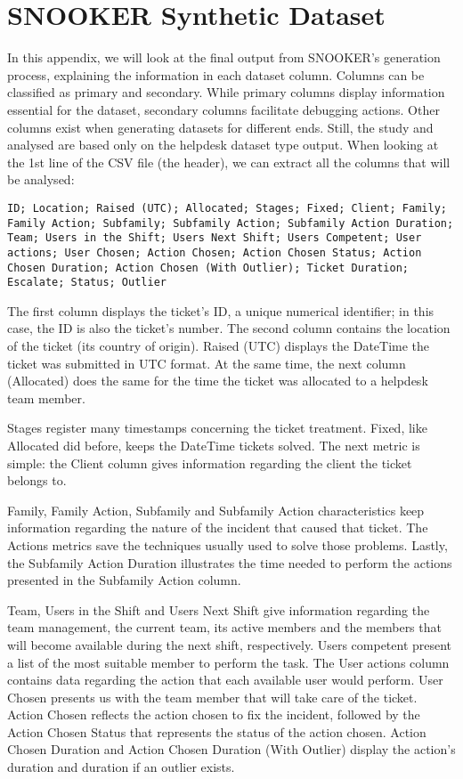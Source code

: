 \chapter{SNOOKER Synthetic Dataset} \label{ap3:snooker}
In this appendix, we will look at the final output from SNOOKER’s generation process, explaining the information in each dataset column. Columns can be classified as primary and secondary. While primary columns display information essential for the dataset, secondary columns facilitate debugging actions. Other columns exist when generating datasets for different ends. Still, the study and analysed are based only on the helpdesk dataset type output. When looking at the 1st line of the CSV file (the header), we can extract all the columns that will be analysed:

\begin{lstlisting}[breaklines=true]
  ID; Location; Raised (UTC); Allocated; Stages; Fixed; Client; Family; Family Action; Subfamily; Subfamily Action; Subfamily Action Duration; Team; Users in the Shift; Users Next Shift; Users Competent; User actions; User Chosen; Action Chosen; Action Chosen Status; Action Chosen Duration; Action Chosen (With Outlier); Ticket Duration; Escalate; Status; Outlier

\end{lstlisting}

The first column displays the ticket's ID, a unique numerical identifier; in this case, the ID is also the ticket's number. The second column contains the location of the ticket (its country of origin). Raised (UTC) displays the DateTime the ticket was submitted in UTC format. At the same time, the next column (Allocated) does the same for the time the ticket was allocated to a helpdesk team member. 

Stages register many timestamps concerning the ticket treatment. Fixed, like Allocated did before, keeps the DateTime tickets solved. The next metric is simple: the Client column gives information regarding the client the ticket belongs to.

Family, Family Action, Subfamily and Subfamily Action characteristics keep information regarding the nature of the incident that caused that ticket. The Actions metrics save the techniques usually used to solve those problems. Lastly, the Subfamily Action Duration illustrates the time needed to perform the actions presented in the Subfamily Action column.

Team, Users in the Shift and Users Next Shift give information regarding the team management, the current team, its active members and the members that will become available during the next shift, respectively. Users competent present a list of the most suitable member to perform the task. The User actions column contains data regarding the action that each available user would perform. User Chosen presents us with the team member that will take care of the ticket. Action Chosen reflects the action chosen to fix the incident, followed by the Action Chosen Status that represents the status of the action chosen. Action Chosen Duration and Action Chosen Duration (With Outlier) display the action's duration and duration if an outlier exists.


